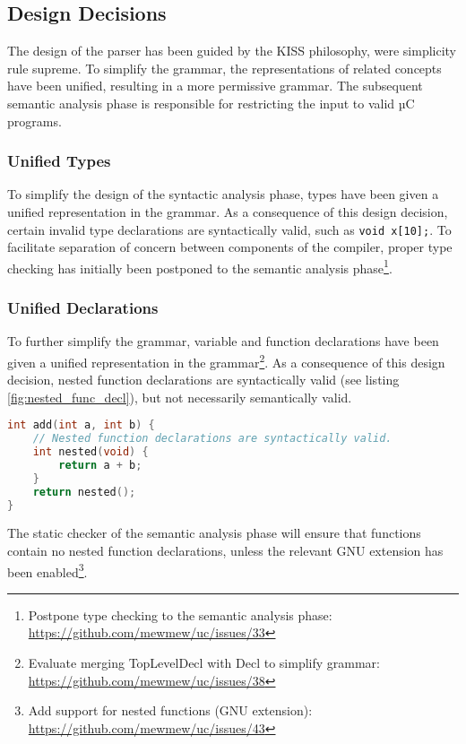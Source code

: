\subsection{Design Decisions}

The design of the parser has been guided by the KISS philosophy, were simplicity rule supreme. To simplify the grammar, the representations of related concepts have been unified, resulting in a more permissive grammar. The subsequent semantic analysis phase is responsible for restricting the input to valid µC programs.

\subsubsection{Unified Types}

To simplify the design of the syntactic analysis phase, types have been given a unified representation in the grammar. As a consequence of this design decision, certain invalid type declarations are syntactically valid, such as \texttt{void x[10];}. To facilitate separation of concern between components of the compiler, proper type checking has initially been postponed to the semantic analysis phase\footnote{Postpone type checking to the semantic analysis phase: \url{https://github.com/mewmew/uc/issues/33}}.

\subsubsection{Unified Declarations}

To further simplify the grammar, variable and function declarations have been given a unified representation in the grammar\footnote{Evaluate merging TopLevelDecl with Decl to simplify grammar: \url{https://github.com/mewmew/uc/issues/38}}. As a consequence of this design decision, nested function declarations are syntactically valid (see listing \ref{fig:nested_func_decl}), but not necessarily semantically valid.

\begin{lstlisting}[language=C,style=c,caption={\label{fig:nested_func_decl}Nested function declarations.}]
int add(int a, int b) {
	// Nested function declarations are syntactically valid.
	int nested(void) {
		return a + b;
	}
	return nested();
}
\end{lstlisting}

The static checker of the semantic analysis phase will ensure that functions contain no nested function declarations, unless the relevant GNU extension has been enabled\footnote{Add support for nested functions (GNU extension): \url{https://github.com/mewmew/uc/issues/43}}.

